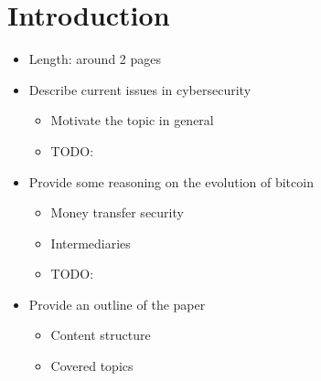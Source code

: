 \section{Introduction}

\begin{itemize}
  \item Length: around 2 pages
  \item Describe current issues in cybersecurity
  \begin{itemize}
    \item Motivate the topic in general
    \item TODO:
  \end{itemize}
  \item Provide some reasoning on the evolution of bitcoin
  \begin{itemize}
    \item Money transfer security
    \item Intermediaries
    \item TODO:
  \end{itemize}
  \item Provide an outline of the paper
  \begin{itemize}
    \item Content structure
    \item Covered topics
  \end{itemize}
\end{itemize}
